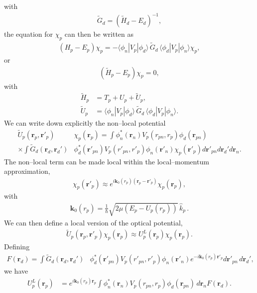 \documentclass[a4paper,11pt]{article}
\newcommand{\ket}[1]{|{#1} \rangle }
\newcommand{\bra}[1]{\langle {#1}|}
\begin{document}
   with
      \begin{align}\label{eq66}
\tilde G_d=(\tilde H_d-E_d)^{-1},
      \end{align} 
the equation for $\chi_p$ can then be written as
      \begin{align}\label{eq67}
(H_p-E_p)\chi_p=-\bra{\phi_n}V_p\ket{\phi_d}\,\tilde G_d\,\bra{\phi_d}V_p\ket{\phi_n}\chi_p,
      \end{align}
or
\begin{align}\label{eq68}
(\tilde H_p-E_p)\chi_p=0,
\end{align}      
with
\begin{align}\label{eq69}
\nonumber \tilde H_p&=T_p+U_p+\tilde U_p,\\
\tilde U_p&=\bra{\phi_n}V_p\ket{\phi_d}\,\tilde G_d\,\bra{\phi_d}V_p\ket{\phi_n}.
\end{align}  
We can write down explicitly the non--local potential
  \begin{align}\label{eq52}
\nonumber \tilde U_p(\mathbf r_p,\mathbf r'_p)&\chi_p(\mathbf r_p)
 =   \int  \phi_n^*(\mathbf r_n)V_p(r_{pn},r_p)\phi_d(\mathbf r_{pn})\\
\times \int \tilde G_d(\mathbf r_d,\mathbf r_d')&\phi_d^*(\mathbf r'_{pn})V_p(r'_{pn},r'_p)\phi_n(\mathbf r'_n)\chi_p(\mathbf r'_p)d\mathbf r'_{pn}d\mathbf r_d'd\mathbf r_n.
 \end{align}
The non--local term can be made local within the local--momentum approximation,
\begin{align}\label{eq28}
\chi_p(\mathbf r'_p)\approx e^{i\mathbf k_0(r_p)(\mathbf r_p-\mathbf r'_p)}\chi_p(\mathbf r_p),
\end{align}
with 
\begin{align}\label{eq29}
\mathbf k_0(r_p)=\frac{1}{\hbar}\sqrt{2\mu\left(E_p-U_p(r_p)\right)}\,\hat k_p\,.
\end{align}
We can then define a local version of the optical potential,
\begin{align}\label{eq31}
\tilde U_p(\mathbf r_p,\mathbf r'_p)\chi_p(\mathbf r_p)\approx U^L_p(\mathbf r_p)\chi_p(\mathbf r_p).
\end{align}
Defining 
\begin{align}\label{eq71}
F(\mathbf r_d)=\int \tilde G_d(\mathbf r_d,\mathbf r_d')&\phi_d^*(\mathbf r'_{pn})V_p(r'_{pn},r'_p)\phi_n(\mathbf r'_n)e^{-i\mathbf k_0(r_p)\mathbf r'_p}d\mathbf r'_{pn}\,  d\mathbf r_d',
\end{align}
we have
 \begin{align}\label{eq32}
 U^L_p(\mathbf r_p) &= e^{i\mathbf k_0(r_p)\mathbf r_p}\int  \phi_n^*(\mathbf r_n)V_p(r_{pn},r_p)\phi_d(\mathbf r_{pn})\,d\mathbf r_nF(\mathbf r_d).
 \end{align}
\end{document}
